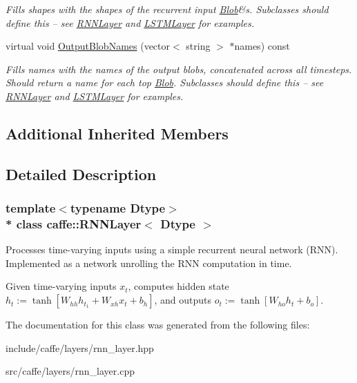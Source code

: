 \begin{DoxyCompactItemize}
\begin{DoxyCompactList}\small\item\em Fills shapes with the shapes of the recurrent input \hyperlink{classcaffe_1_1Blob}{Blob}\&s. Subclasses should define this -- see \hyperlink{classcaffe_1_1RNNLayer}{R\+N\+N\+Layer} and \hyperlink{classcaffe_1_1LSTMLayer}{L\+S\+T\+M\+Layer} for examples. \end{DoxyCompactList}\item 
virtual void \hyperlink{classcaffe_1_1RNNLayer_aae8d937b95daecf90fe7875f4253d52f}{Output\+Blob\+Names} (vector$<$ string $>$ $\ast$names) const \hypertarget{classcaffe_1_1RNNLayer_aae8d937b95daecf90fe7875f4253d52f}{}\label{classcaffe_1_1RNNLayer_aae8d937b95daecf90fe7875f4253d52f}

\begin{DoxyCompactList}\small\item\em Fills names with the names of the output blobs, concatenated across all timesteps. Should return a name for each top \hyperlink{classcaffe_1_1Blob}{Blob}. Subclasses should define this -- see \hyperlink{classcaffe_1_1RNNLayer}{R\+N\+N\+Layer} and \hyperlink{classcaffe_1_1LSTMLayer}{L\+S\+T\+M\+Layer} for examples. \end{DoxyCompactList}\end{DoxyCompactItemize}
\subsection*{Additional Inherited Members}


\subsection{Detailed Description}
\subsubsection*{template$<$typename Dtype$>$\\*
class caffe\+::\+R\+N\+N\+Layer$<$ Dtype $>$}

Processes time-\/varying inputs using a simple recurrent neural network (R\+NN). Implemented as a network unrolling the R\+NN computation in time. 

Given time-\/varying inputs $ x_t $, computes hidden state $ h_t := \tanh[ W_{hh} h_{t_1} + W_{xh} x_t + b_h ] $, and outputs $ o_t := \tanh[ W_{ho} h_t + b_o ] $. 

The documentation for this class was generated from the following files\+:\begin{DoxyCompactItemize}
\item 
include/caffe/layers/rnn\+\_\+layer.\+hpp\item 
src/caffe/layers/rnn\+\_\+layer.\+cpp\end{DoxyCompactItemize}
